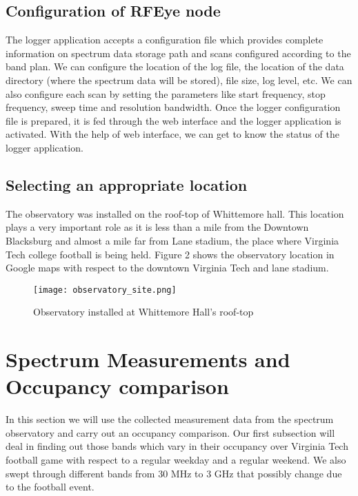 \documentclass[12pt,sts]{report}
\begin{document}
\subsection{Configuration of RFEye node}
	
	The logger application accepts a configuration file which provides complete information on spectrum data storage path and scans configured according to the band plan. We can configure the location of the log file, the location of the data directory (where the spectrum data will be stored), file size, log level, etc. We can also configure each scan by setting the parameters like start frequency, stop frequency, sweep time and resolution bandwidth. Once the logger configuration file is prepared, it is fed through the web interface and the logger application is activated. With the help of web interface, we can get to know the status of the logger application.

\subsection{Selecting an appropriate location}
	
	The observatory was installed on the roof-top of Whittemore hall. This location plays a very important role as it is less than a mile from the Downtown Blacksburg and almost a mile far from Lane stadium, the place where Virginia Tech college football is being held. Figure 2 shows the observatory location in Google maps with respect to the downtown Virginia Tech and lane stadium.
	
	\begin{figure}[ht!]
  \centering
    \texttt{[image: observatory\_site.png]}
		\caption{Observatory installed at Whittemore Hall's roof-top}
	\end{figure}

\pagebreak


\section{Spectrum Measurements and Occupancy comparison}

In this section we will use the collected measurement data from the spectrum observatory and carry out an occupancy comparison. Our first subsection will deal in finding out those bands which vary in their occupancy over Virginia Tech football game with respect to a regular weekday and a regular weekend. We also swept through different bands from 30 MHz to 3 GHz that possibly change due to the football event.
\end{document}
